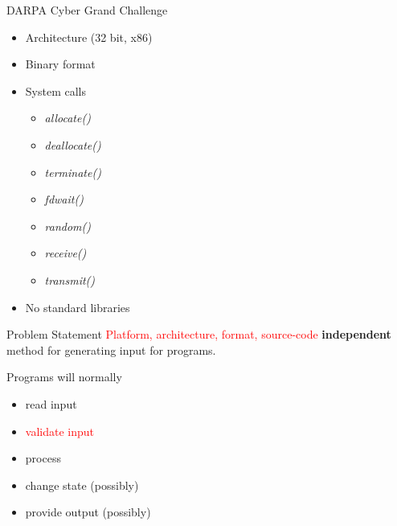 \documentclass[pdf]{beamer}
\begin{document}
\begin{frame}{DARPA Cyber Grand Challenge}
\begin{itemize}
\item Architecture (32 bit, x86)
\item Binary format
\item System calls
	\begin{itemize}
	\item \textit{allocate()}
	\item \textit{deallocate()}
	\item \textit{terminate()}
	\item \textit{fdwait()}
	\item \textit{random()}
	\item \textit{receive()}
	\item \textit{transmit()}
	\end{itemize}
\item No standard libraries 
\end{itemize}
\end{frame}

\begin{frame}{Problem Statement}
\textcolor{red}{Platform, architecture, format, source-code} \textbf{independent} method for generating input for programs.
\end{frame}

\begin{frame}{}
Programs will normally
\begin{itemize}
\item read input
\pause
\item \textcolor{red}{validate input}
\pause
\item process
\pause
\item change state (possibly)
\pause
\item provide output (possibly)
\end{itemize}
\end{frame}
\end{document}
